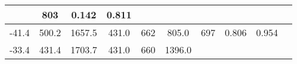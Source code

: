 \documentclass[a4paper,10pt]{article}
\begin{document}
\begin{longtable}{
     |
%    
    c|
%    
    c|
%    
    c|
%    
    c|
%    
    c|
%    
    c|
%    
    c|
%    
    c|
%    
    c|
%    
    c|
%    
    }
%        
        & 803
%        

%        

%        
        & 0.142
%        

%        

%        
        & 0.811
%        

%        
        \\
        \hline

        

%        

%        
        -41.4
%        

%        

%        
        & 500.2
%        

%        

%        
        & 1657.5
%        

%        

%        
        & 431.0
%        

%        

%        
        & 662
%        

%        

%        
        & 805.0
%        

%        

%        
        & 697
%        

%        

%        
        & 0.806
%        

%        

%        
        & 0.954
%        

%        
        \\
        \hline

        

%        

%        
        -33.4
%        

%        

%        
        & 431.4
%        

%        

%        
        & 1703.7
%        

%        

%        
        & 431.0
%        

%        

%        
        & 660
%        

%        

%        
        & 1396.0
%        

%        


\end{longtable}
\end{document}
